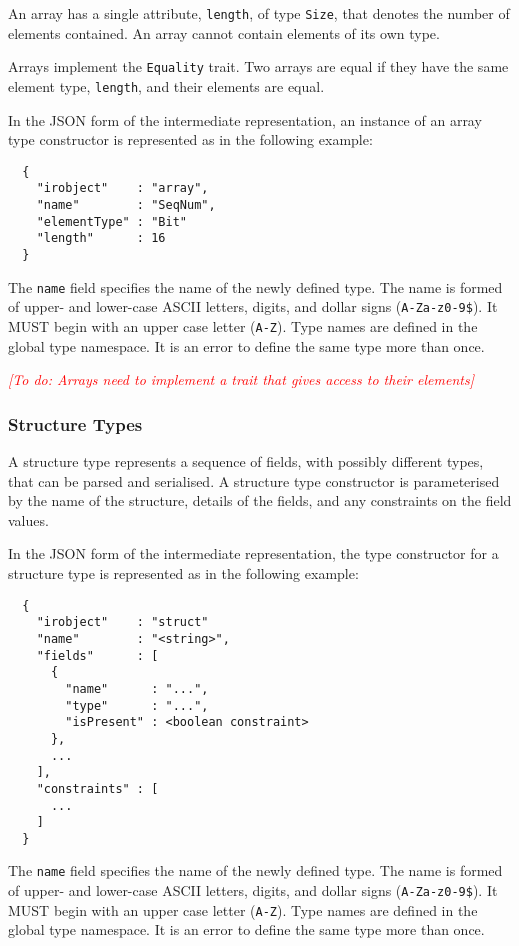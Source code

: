 \documentclass[10pt,twocolumn,a4paper]{article}
\newcommand{\todo}[1]{\textit{\textcolor{red}{[To do: #1]}}}
\newcommand{\code}[1]{\texttt{#1}}
\begin{document}
An array has a single attribute, \code{length}, of type \code{Size}, that
denotes the number of elements contained. An array cannot contain elements
of its own type.

Arrays implement the \code{Equality} trait. Two arrays are equal if they
have the same element type, \code{length}, and their elements are equal.

In the JSON form of the intermediate representation, an instance of an
array type constructor is represented as in the following example:
\begin{verbatim}
  {
    "irobject"    : "array",
    "name"        : "SeqNum",
    "elementType" : "Bit"
    "length"      : 16
  }
\end{verbatim}
The \code{name} field specifies the name of the newly defined type. The
name is formed of upper- and lower-case ASCII letters, digits, and dollar
signs (\code{A-Za-z0-9\$}).  It MUST begin with an upper case letter
(\code{A-Z}). Type names are defined in the global type namespace.
It is an error to define the same type more than once.

\todo{Arrays need to implement a trait that gives access to their elements}

\subsubsection{Structure Types}

A structure type represents a sequence of fields, with possibly different
types, that can be parsed and serialised. A structure type constructor is
parameterised by the name of the structure, details of the fields, and any
constraints on the field values.

In the JSON form of the intermediate representation, the type constructor
for a structure type is represented as in the following example:
\footnotesize
\begin{verbatim}
  {
    "irobject"    : "struct"
    "name"        : "<string>",
    "fields"      : [
      {
        "name"      : "...",
        "type"      : "...",
        "isPresent" : <boolean constraint>
      },
      ...
    ],
    "constraints" : [
      ...
    ]
  }
\end{verbatim}
\normalsize
The \code{name} field specifies the name of the newly defined type. The
name is formed of upper- and lower-case ASCII letters, digits, and dollar
signs (\code{A-Za-z0-9\$}).  It MUST begin with an upper case letter
(\code{A-Z}). Type names are defined in the global type namespace.
It is an error to define the same type more than once.
\end{document}
